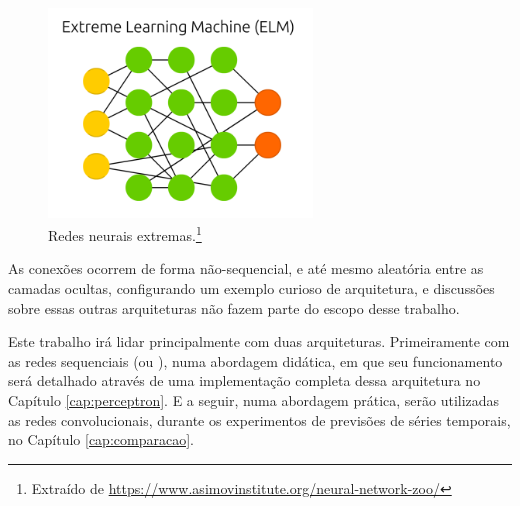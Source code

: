 \begin{figure}[htb]
\centering
\includegraphics[width=7cm]{figuras/estrutura_e}
\caption{Redes neurais extremas.\footnote{Extraído de \url{https://www.asimovinstitute.org/neural-network-zoo/}}}
\label{fig:estrutura_e}
\end{figure}

As conexões ocorrem de forma não-sequencial, e até mesmo aleatória entre as camadas ocultas, configurando um exemplo curioso de arquitetura, e discussões sobre essas outras arquiteturas não fazem parte do escopo desse trabalho.

Este trabalho irá lidar principalmente com duas arquiteturas. Primeiramente com as redes sequenciais (ou ), numa abordagem didática, em que seu funcionamento será detalhado através de uma implementação completa dessa arquitetura no Capítulo \ref{cap:perceptron}. E a seguir, numa abordagem prática, serão utilizadas as redes convolucionais, durante os experimentos de previsões de séries temporais, no Capítulo \ref{cap:comparacao}.